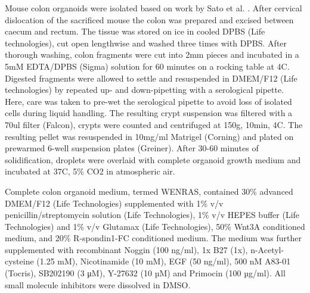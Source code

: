 \begin{flushleft}
Mouse colon organoids were isolated based on work by Sato et al. \parencite{satoSingleLgr5Stem2009}. After cervical dislocation of the sacrificed mouse the colon was prepared and excised between caecum and rectum. The tissue was stored on ice in cooled DPBS (Life technologies), cut open lengthwise and washed three times with DPBS. After thorough washing, colon fragments were cut into 2mm pieces and incubated in a 5mM EDTA/DPBS (Sigma) solution for 60 minutes on a rocking table at 4C. Digested fragments were allowed to settle and resuspended in DMEM/F12 (Life technologies) by repeated up- and down-pipetting with a serological pipette. Here, care was taken to pre-wet the serological pipette to avoid loss of isolated cells during liquid handling. The resulting crypt suspension was filtered with a 70ul filter (Falcon), crypts were counted and centrifuged at 150g, 10min, 4C. The resulting pellet was resuspended in 10mg/ml Matrigel (Corning) and plated on prewarmed 6-well suspension plates (Greiner). After 30-60 minutes of solidification, droplets were overlaid with complete organoid growth medium and incubated at 37C, 5\% CO2 in atmospheric air.

Complete colon organoid medium, termed WENRAS, contained 30\% advanced DMEM/F12 (Life Technologies) supplemented with 1\% v/v penicillin/streptomycin solution (Life Technologies), 1\% v/v HEPES buffer (Life Technologies) and 1\% v/v Glutamax (Life Technologies), 50\% Wnt3A conditioned medium, and 20\% R-spondin1-FC conditioned medium. 
The medium was further supplemented with recombinant Noggin (100 ng/ml), 1x B27 (1x), n-Acetyl-cysteine (1.25 mM), Nicotinamide (10 mM), EGF (50 ng/ml), 500 nM A83-01 (Tocris), SB202190 (3 μM), Y-27632 (10 µM) and Primocin (100 µg/ml). All small molecule inhibitors were dissolved in DMSO. 



\end{flushleft}

